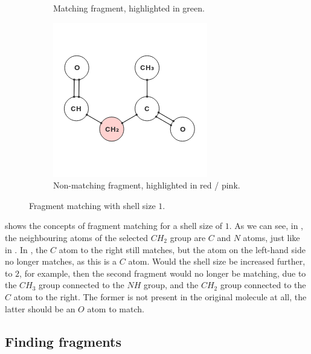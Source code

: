 \begin{figure}
\begin{subfigure}[t]{0.29\textwidth}
\caption{Matching fragment, highlighted in green.}
\end{subfigure}%
\qquad
\begin{subfigure}[t]{0.29\textwidth}
\centering
\includegraphics[width=\textwidth]{img/shell_3.png}
\caption{Non-matching fragment, highlighted in red / pink.}
\end{subfigure}
\caption{Fragment matching with shell size $1$.}
\end{figure}

 shows the concepts of fragment matching for a shell size of $1$. As we can see, in , the neighbouring atoms of the selected $CH_{2}$ group are $C$ and $N$ atoms, just like in . In , the $C$ atom to the right still matches, but the atom on the left-hand side no longer matches, as this is a $C$ atom. Would the shell size be increased further, to $2$, for example, then the second fragment would no longer be matching, due to the $CH_{3}$ group connected to the $NH$ group, and the $CH_{2}$ group connected to the $C$ atom to the right. The former is not present in the original molecule at all, the latter should be an $O$ atom to match.

\subsection{Finding fragments}
\nlipsum
